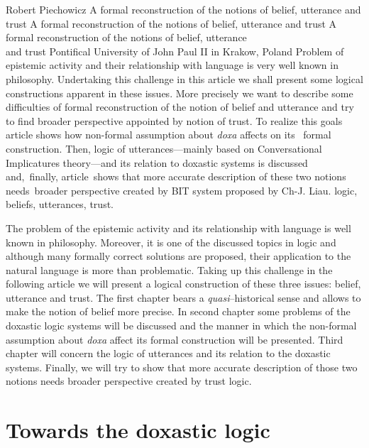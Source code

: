 \begin{artengenv}{Robert Piechowicz}
	{A formal reconstruction of the notions of belief, utterance and trust}
	{A formal reconstruction of the notions of belief, utterance and trust}
	{A formal reconstruction of the notions of belief, utterance\\and trust}
	{Pontifical University of John Paul II in Krakow, Poland}
	{Problem of epistemic activity and their relationship with language is very well known in philosophy. Undertaking this challenge in this article we shall present some logical constructions apparent in these issues. More precisely we want to describe some difficulties of formal reconstruction of the notion of belief and utterance and try to find broader perspective appointed by notion of trust. To realize this goals article shows how non-formal assumption about \textit{doxa} affects on its  formal construction. Then, logic of utterances---mainly based on Conversational Implicatures theory---and its relation to doxastic systems is discussed and, finally, article shows that more accurate description of these two notions needs broader perspective created by BIT system proposed by Ch-J. Liau.}
	{logic, beliefs, utterances, trust.}



\indent \lettrine[loversize=0.13,lines=2,lraise=-0.05,nindent=0em,findent=0.2pt]%
{T}{}he problem of the epistemic activity and its relationship with language is well known in philosophy. Moreover, it is one of the discussed topics in logic and although many formally correct solutions are proposed, their application to the natural language is more than problematic. Taking up this challenge in the following article we will present a logical construction of these three issues: belief, utterance and trust. The first chapter bears a \textit{quasi}--historical sense and allows to make the notion of belief more precise. In second chapter some problems of the doxastic logic systems will be discussed and the manner in which the non-formal assumption about \textit{doxa} affect its formal construction will be presented. Third chapter will concern the logic of utterances and its relation to the doxastic systems. Finally, we will try to show that more accurate description of those two notions needs broader perspective created by trust logic.

\section{Towards the doxastic logic}


\end{artengenv}
